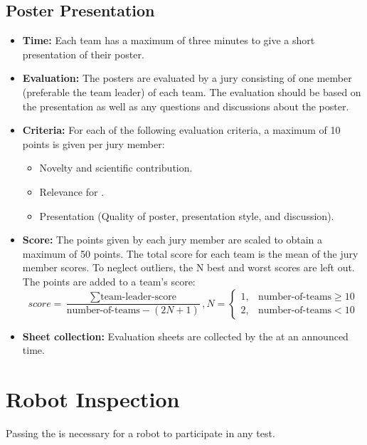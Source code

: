 \subsection*{Poster Presentation}
\label{sec:setupdays:posterpresentation}
\begin{itemize}
	\item \textbf{Time:} Each team has a maximum of three minutes to give a short presentation of their poster.
	\item \textbf{Evaluation:} The posters are evaluated by a jury consisting of one member (preferable the team leader) of each team. The evaluation should be based on the presentation as well as any questions and discussions about the poster.
	\item \textbf{Criteria:} For each of the following evaluation criteria, a maximum of 10 points is given per jury member:
	\begin{itemize}
		\item Novelty and scientific contribution.
		\item Relevance for \RoboCup\AtHome{}.
		\item Presentation (Quality of poster, presentation style, and discussion).
	\end{itemize}
	\item \textbf{Score:} The points given by each jury member are scaled to obtain a maximum of 50 points. The total score for each team is the mean of the jury member scores. To neglect outliers, the N best and worst scores are left out. The points are added to a team's \SONE{} score:
	$$
	score=\frac{\sum \text{team-leader-score}}{\text{number-of-teams}-\left ( 2N+1  \right )},N=\left\{\begin{matrix}
	1, & \text{number-of-teams} \geq 10\\
	2, & \text{number-of-teams} < 10
	\end{matrix}\right.
	$$
	\item \textbf{Sheet collection:} Evaluation sheets are collected by the \OC{} at an announced time.
\end{itemize}

\section{Robot Inspection}
\label{sec:setupdays:inspection}
Passing the \RobotInspection{} is necessary for a robot to participate in any test.

